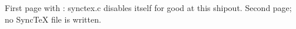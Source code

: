 
First page with \string{}: synctex.c disables itself for good at this shipout.
\vfill\eject
{}
Second page; no SyncTeX file is written.
\bye

